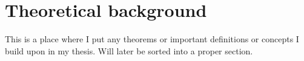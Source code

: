 \clearpage{\thispagestyle{empty}}
\section{Theoretical background}
	
	This is a place where I put any theorems or important definitions or concepts I build upon in my thesis. Will later be sorted into a proper section.
